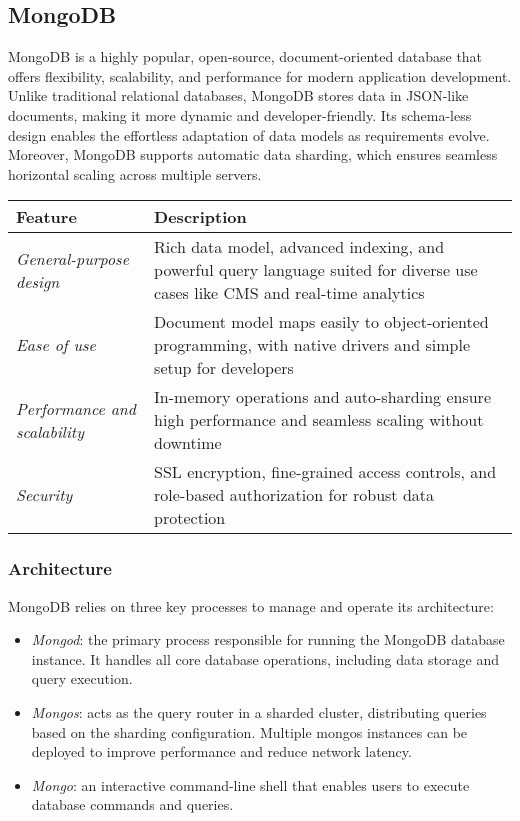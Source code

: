 \subsection{MongoDB}
MongoDB is a highly popular, open-source, document-oriented database that offers flexibility, scalability, and performance for modern application development. 
Unlike traditional relational databases, MongoDB stores data in JSON-like documents, making it more dynamic and developer-friendly. 
Its schema-less design enables the effortless adaptation of data models as requirements evolve. 
Moreover, MongoDB supports automatic data sharding, which ensures seamless horizontal scaling across multiple servers.
\begin{table}[h!]
    \centering
    \begin{tabular}{|l|p{10cm}|}
    \hline
    \textbf{Feature} & \textbf{Description} \\ \hline
    \textit{General-purpose design} & Rich data model, advanced indexing, and powerful query language suited for diverse use cases like CMS and real-time analytics \\ \hline
    \textit{Ease of use} & Document model maps easily to object-oriented programming, with native drivers and simple setup for developers \\ \hline
    \textit{Performance and scalability} & In-memory operations and auto-sharding ensure high performance and seamless scaling without downtime \\ \hline
    \textit{Security} & SSL encryption, fine-grained access controls, and role-based authorization for robust data protection \\ \hline
    \end{tabular}
\end{table}

\subsubsection{Architecture}
MongoDB relies on three key processes to manage and operate its architecture:
\begin{itemize} 
    \item \textit{Mongod}: the primary process responsible for running the MongoDB database instance. 
        It handles all core database operations, including data storage and query execution. 
    \item \textit{Mongos}: acts as the query router in a sharded cluster, distributing queries based on the sharding configuration. 
        Multiple mongos instances can be deployed to improve performance and reduce network latency. 
    \item \textit{Mongo}: an interactive command-line shell that enables users to execute database commands and queries. 
\end{itemize}

